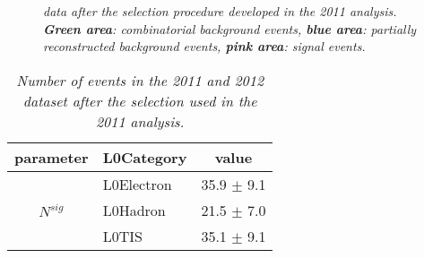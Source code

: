 \begin{figure}[ht]
\begin{center}
\end{center}
\caption{\textit{\BdKstee \lhcb data after the selection procedure developed in the 2011 analysis. \textbf{Green area}: combinatorial background events, \textbf{blue area}: partially reconstructed background events, \textbf{pink area}: \BdKstee signal events.}}
\label{fig:oldeedata}
\end{figure}

\begin{table}[ht]
\begin{center}
\begin{tabular}{c|l|c}
parameter & L0Category & value \\
\hline
\hline
& L0Electron & 35.9 $\pm$ 9.1 \\
$N^{sig}$ & L0Hadron & 21.5 $\pm$ 7.0\\
 & L0TIS &   35.1 $\pm$  9.1\\
\end{tabular}
\end{center}
\caption{\textit{Number of \BdKstee events in the 2011 and 2012 \lhcb dataset after the selection used in the 2011 analysis.}}
\label{tab:comp}
\vspace*{19cm}
\end{table}







%

